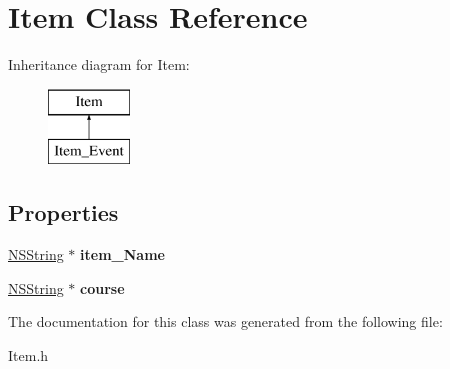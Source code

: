 \hypertarget{interface_item}{
\section{Item Class Reference}
\label{interface_item}
}
Inheritance diagram for Item:\begin{figure}[H]
\begin{center}
\leavevmode
\includegraphics[height=2.000000cm]{interface_item}
\end{center}
\end{figure}
\subsection*{Properties}
\begin{DoxyCompactItemize}
\item 
\hypertarget{interface_item_ab04c3e45f1b99371a570686d96a1caa4}{
\hyperlink{class_n_s_string}{NSString} $\ast$ {\bfseries item\_\-Name}}
\label{interface_item_ab04c3e45f1b99371a570686d96a1caa4}

\item 
\hypertarget{interface_item_af7b6abc4eba186d9e75061cfa92c6a33}{
\hyperlink{class_n_s_string}{NSString} $\ast$ {\bfseries course}}
\label{interface_item_af7b6abc4eba186d9e75061cfa92c6a33}

\end{DoxyCompactItemize}


The documentation for this class was generated from the following file:\begin{DoxyCompactItemize}
\item 
Item.h\end{DoxyCompactItemize}
